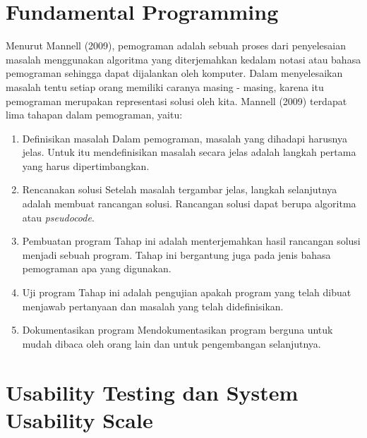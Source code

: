 \section{Fundamental Programming}
	Menurut Mannell (2009), pemograman adalah sebuah proses dari penyelesaian masalah menggunakan algoritma yang diterjemahkan kedalam notasi atau bahasa pemograman sehingga dapat dijalankan oleh komputer. Dalam menyelesaikan masalah tentu setiap orang memiliki caranya masing - masing, karena itu pemograman merupakan representasi solusi oleh kita.
	\linebreak\linebreak
	Mannell (2009) terdapat lima tahapan dalam pemograman, yaitu:
	\begin{enumerate}
		\item Definisikan masalah
			\subitem Dalam pemograman, masalah yang dihadapi harusnya jelas. Untuk itu mendefinisikan masalah secara jelas adalah langkah pertama yang harus dipertimbangkan.
		\item Rencanakan solusi
			\subitem Setelah masalah tergambar jelas, langkah selanjutnya adalah membuat rancangan solusi. Rancangan solusi dapat berupa algoritma atau \textit{pseudocode}.
		\item Pembuatan program
			\subitem Tahap ini adalah menterjemahkan hasil rancangan solusi menjadi sebuah program. Tahap ini bergantung juga pada jenis bahasa pemograman apa yang digunakan.
		\item Uji program
			\subitem Tahap ini adalah pengujian apakah program yang telah dibuat menjawab pertanyaan dan masalah yang telah didefinisikan.
		\item Dokumentasikan program
			\subitem Mendokumentasikan program berguna untuk mudah dibaca oleh orang lain dan untuk pengembangan selanjutnya.
	\end{enumerate}
	
\section{Usability Testing dan System Usability Scale}


